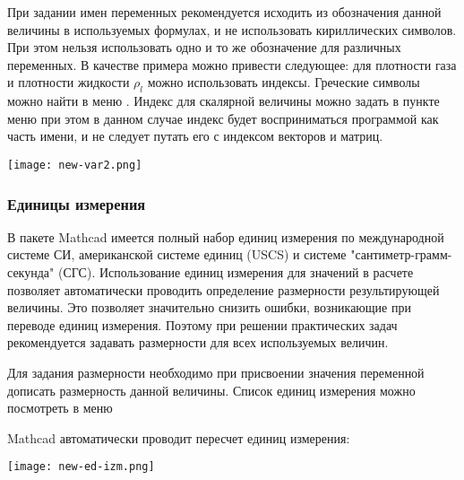 При задании имен переменных рекомендуется исходить из обозначения данной величины в используемых формулах, и не использовать кириллических символов. При этом нельзя использовать одно и то же обозначение для различных переменных. В качестве примера можно привести следующее: для плотности газа  и плотности жидкости $\rho_l$ можно использовать индексы. Греческие символы можно найти в меню  . Индекс для скалярной величины можно задать в пункте меню  при этом в данном случае индекс будет восприниматься программой как часть имени, и не следует путать его с индексом векторов и матриц.
\begin{center}
	\texttt{[image: new-var2.png]}
\end{center}


\subsubsection*{Единицы измерения}
В пакете Mathcad имеется полный набор единиц измерения по международной системе СИ,  американской системе единиц  (USCS) и системе "сантиметр-грамм-секунда" (СГС). Использование единиц измерения для значений в расчете позволяет автоматически проводить определение размерности результирующей величины. Это позволяет значительно снизить ошибки, возникающие при переводе единиц измерения. Поэтому при решении практических задач рекомендуется задавать размерности для всех используемых величин.

Для задания размерности необходимо при присвоении значения переменной дописать размерность данной величины. Список единиц измерения можно посмотреть в меню 

Mathcad автоматически проводит пересчет единиц измерения: 
\begin{center}
	\texttt{[image: new-ed-izm.png]}
\end{center}

